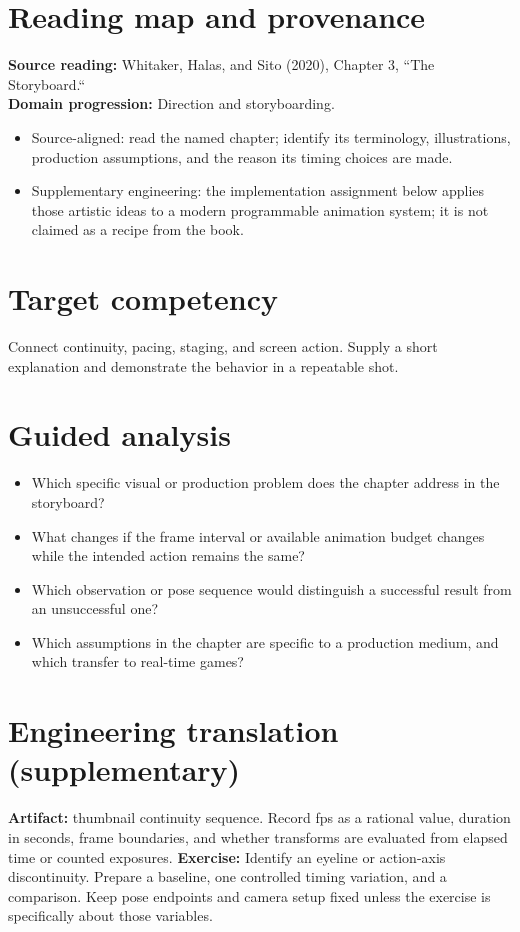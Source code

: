 \documentclass[10pt,letterpaper]{article}
\begin{document}
\makedoctitle
\makedocsummary

\section{Reading map and provenance}
\textbf{Source reading:} Whitaker, Halas, and Sito (2020), Chapter 3, ``The Storyboard.``\\
\textbf{Domain progression:} Direction and storyboarding.
\begin{itemize}
\item Source-aligned: read the named chapter; identify its terminology, illustrations, production assumptions, and the reason its timing choices are made.
\item Supplementary engineering: the implementation assignment below applies those artistic ideas to a modern programmable animation system; it is not claimed as a recipe from the book.
\end{itemize}
\section{Target competency}
Connect continuity, pacing, staging, and screen action. Supply a short explanation and demonstrate the behavior in a repeatable shot.
\section{Guided analysis}
\begin{itemize}
\item Which specific visual or production problem does the chapter address in the storyboard?
\item What changes if the frame interval or available animation budget changes while the intended action remains the same?
\item Which observation or pose sequence would distinguish a successful result from an unsuccessful one?
\item Which assumptions in the chapter are specific to a production medium, and which transfer to real-time games?
\end{itemize}
\section{Engineering translation (supplementary)}
\textbf{Artifact:} thumbnail continuity sequence. Record fps as a rational value, duration in seconds, frame boundaries, and whether transforms are evaluated from elapsed time or counted exposures.
\textbf{Exercise:} Identify an eyeline or action-axis discontinuity. Prepare a baseline, one controlled timing variation, and a comparison. Keep pose endpoints and camera setup fixed unless the exercise is specifically about those variables.
\end{document}
